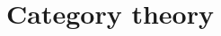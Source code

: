 \documentclass[aps,twocolumn]{revtex4-1}
\begin{document}

% 



\appendix

\section{Category theory}\label{app:CatTh}


%
\end{document}
